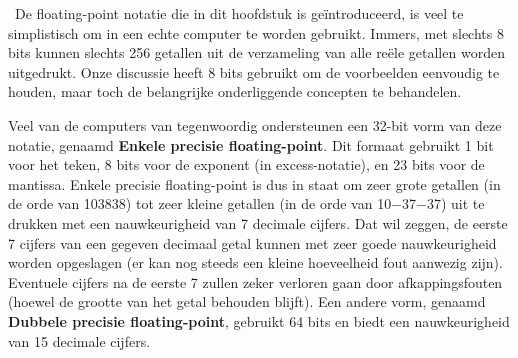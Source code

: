 \begin{aside}\mbox{}\
De floating-point notatie die in dit hoofdstuk is geïntroduceerd, is veel te simplistisch om in een echte computer te worden gebruikt. Immers, met slechts 8 bits kunnen slechts 256 getallen uit de verzameling van alle reële getallen worden uitgedrukt. Onze discussie heeft 8 bits gebruikt om de voorbeelden eenvoudig te houden, maar toch de belangrijke onderliggende concepten te behandelen.

Veel van de computers van tegenwoordig ondersteunen een 32-bit vorm van deze notatie, genaamd \textbf{Enkele precisie floating-point}. Dit formaat gebruikt 1 bit voor het teken, 8 bits voor de exponent (in excess-notatie), en 23 bits voor de mantissa. Enkele precisie floating-point is dus in staat om zeer grote getallen (in de orde van 103838) tot zeer kleine getallen (in de orde van 10−37−37) uit te drukken met een nauwkeurigheid van 7 decimale cijfers. Dat wil zeggen, de eerste 7 cijfers van een gegeven decimaal getal kunnen met zeer goede nauwkeurigheid worden opgeslagen (er kan nog steeds een kleine hoeveelheid fout aanwezig zijn). Eventuele cijfers na de eerste 7 zullen zeker verloren gaan door afkappingsfouten (hoewel de grootte van het getal behouden blijft). Een andere vorm, genaamd \textbf{Dubbele precisie floating-point}, gebruikt 64 bits en biedt een nauwkeurigheid van 15 decimale cijfers.
\end{aside}
